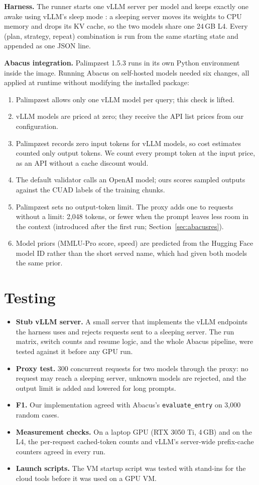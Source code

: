 \documentclass[a4paper,12pt]{report}
\newcommand{\code}[1]{\texttt{#1}}
\begin{document}
\textbf{Harness.} The runner starts one vLLM server per model and keeps exactly one awake using
vLLM's sleep mode \cite{kwon2023vllm}: a sleeping server moves its weights to CPU memory and drops its
KV cache, so the two models share one 24\,GB L4. Every (plan, strategy, repeat) combination is run
from the same starting state and appended as one JSON line.

\textbf{Abacus integration.} Palimpzest 1.5.3 runs in its own Python environment inside the image.
Running Abacus on self-hosted models needed six changes, all applied at runtime without modifying the
installed package:
\begin{enumerate}
\item Palimpzest allows only one vLLM model per query; this check is lifted.
\item vLLM models are priced at zero; they receive the API list prices from our configuration.
\item Palimpzest records zero input tokens for vLLM models, so cost estimates counted only output
tokens. We count every prompt token at the input price, as an API without a cache discount would.
\item The default validator calls an OpenAI model; ours scores sampled outputs against the CUAD
labels of the training chunks.
\item Palimpzest sets no output-token limit. The proxy adds one to requests without a limit: 2,048
tokens, or fewer when the prompt leaves less room in the context (introduced after the first run;
Section~\ref{sec:abacusres}).
\item Model priors (MMLU-Pro score, speed) are predicted from the Hugging Face model ID rather than
the short served name, which had given both models the same prior.
\end{enumerate}

\section{Testing}

\begin{itemize}
\item \textbf{Stub vLLM server.} A small server that implements the vLLM endpoints the harness uses
and rejects requests sent to a sleeping server. The run matrix, switch counts and resume logic, and
the whole Abacus pipeline, were tested against it before any GPU run.
\item \textbf{Proxy test.} 300 concurrent requests for two models through the proxy: no request may
reach a sleeping server, unknown models are rejected, and the output limit is added and lowered for
long prompts.
\item \textbf{F1.} Our implementation agreed with Abacus's \code{evaluate\_entry} on 3,000 random
cases.
\item \textbf{Measurement checks.} On a laptop GPU (RTX 3050 Ti, 4\,GB) and on the L4, the
per-request cached-token counts and vLLM's server-wide prefix-cache counters agreed in every run.
\item \textbf{Launch scripts.} The VM startup script was tested with stand-ins for the cloud tools
before it was used on a GPU VM.
\end{itemize}
\end{document}
